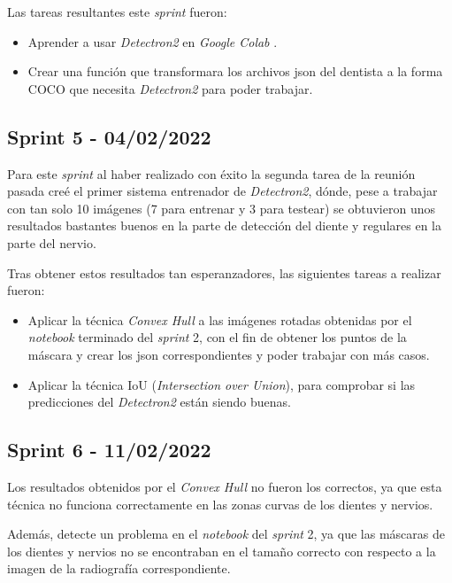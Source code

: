 Las tareas resultantes este \emph{sprint} fueron:
\begin{itemize}
    \item Aprender a usar \emph{Detectron2} en \emph{Google Colab} .
    \item Crear una función que transformara los archivos json del dentista a la forma COCO que necesita \emph{Detectron2} para poder trabajar.
\end{itemize}
\subsection{Sprint 5 - 04/02/2022}
Para este \emph{sprint} al haber realizado con éxito la segunda tarea de la reunión pasada creé el primer sistema entrenador de \emph{Detectron2}, dónde, pese a trabajar con tan solo 10 imágenes (7 para entrenar y 3 para testear) se obtuvieron unos resultados bastantes buenos en la parte de detección del diente y regulares en la parte del nervio.

Tras obtener estos resultados tan esperanzadores, las siguientes tareas a realizar fueron:
\begin{itemize}
    \item Aplicar la técnica  \emph{Convex Hull} a las imágenes rotadas obtenidas por el  \emph{notebook} terminado del  \emph{sprint} 2, con el fin de obtener los puntos de la máscara y crear los json correspondientes y poder trabajar con más casos.
    \item Aplicar la técnica IoU (\emph{Intersection over Union}), para comprobar si las predicciones del \emph{Detectron2} están siendo buenas.
\end{itemize}
\subsection{Sprint 6 - 11/02/2022}
Los resultados obtenidos por el \emph{Convex Hull} no fueron los correctos, ya que esta técnica no funciona correctamente en las zonas curvas de los dientes y nervios.

Además, detecte un problema en el \emph{notebook} del \emph{sprint} 2, ya que las máscaras de los dientes y nervios no se encontraban en el tamaño correcto con respecto a la imagen de la radiografía correspondiente.

